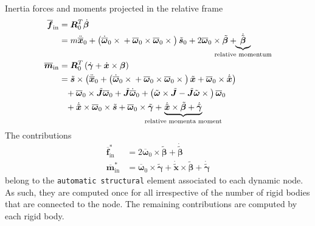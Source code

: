 \documentclass[10pt,dvips,fleqn,subeqn]{report}
\newcommand{\T}[1]{\bm{#1}}
\newcommand{\TT}[1]{\bm{#1}}
\begin{document}
Inertia forces and moments projected in the relative frame
\begin{subequations}
\begin{align}
	\overline{\T{f}}_{\text{in}}
	&= \TT{R}_0^T \dot{\T{\beta}}
	\nonumber \\
	&= m \ddot{\overline{\T{x}}}_0
	+ \plbr{
		\dot{\overline{\T{\omega}}}_0 \times{}
		+ \overline{\T{\omega}}_0 \times \overline{\T{\omega}}_0 \times{}
	} \tilde{\T{s}}_0
	+ 2 \overline{\T{\omega}}_0 \times \tilde{\T{\beta}}
	+ \hspace{-10mm}\underbrace{\dot{\tilde{\T{\beta}}}}_{\text{relative momentum}} \\
%
	\overline{\T{m}}_{\text{in}}
	&= \TT{R}_0^T \plbr{\dot{\T{\gamma}} + \dot{\T{x}} \times \T{\beta}}
	\nonumber \\
	&= \tilde{\T{s}} \times \plbr{
		\ddot{\overline{\T{x}}}_0
		+ \plbr{
			\dot{\overline{\T{\omega}}}_0 \times{}
			+ \overline{\T{\omega}}_0 \times \overline{\T{\omega}}_0 \times{}
		} \tilde{\T{x}}
		+ \overline{\T{\omega}}_0 \times \dot{\tilde{\T{x}}}
	}
	\nonumber \\
	&\hphantom{=}+ \overline{\T{\omega}}_0 \times \tilde{\TT{J}} \overline{\T{\omega}}_0
	+ \tilde{\TT{J}} \dot{\overline{\T{\omega}}}_0
	+ \plbr{
		\tilde{\T{\omega}} \times \tilde{\TT{J}}
		- \tilde{\TT{J}} \tilde{\T{\omega}} \times{}
	} \overline{\T{\omega}}_0
	\nonumber \\
	&\hphantom{=}
	+ \dot{\tilde{\T{x}}} \times \overline{\T{\omega}}_0 \times \tilde{\T{s}}
	+ \overline{\T{\omega}}_0 \times \tilde{\T{\gamma}}
	+ \hspace{-8mm}\underbrace{
		\dot{\tilde{\T{x}}} \times \tilde{\T{\beta}}
		+ \dot{\tilde{\T{\gamma}}}
	}_{\text{relative momenta moment}}
\end{align}
\end{subequations}
The contributions
\begin{subequations}
\begin{align}
	\overline{\T{f}}_{\text{in}}^*
	&= 2 \overline{\T{\omega}}_0 \times \tilde{\T{\beta}}
	+ \dot{\tilde{\T{\beta}}} \\
%
	\overline{\T{m}}_{\text{in}}^*
	&= \overline{\T{\omega}}_0 \times \tilde{\T{\gamma}}
	+ \dot{\tilde{\T{x}}} \times \tilde{\T{\beta}}
	+ \dot{\tilde{\T{\gamma}}}
\end{align}
\end{subequations}
belong to the \texttt{automatic structural} element associated
to each dynamic node.
As such, they are computed once for all irrespective of the number
of rigid bodies that are connected to the node.
The remaining contributions are computed by each rigid body.
\end{document}
